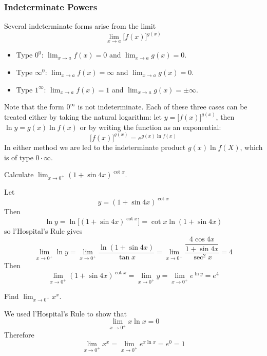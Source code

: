 \subsubsection*{Indeterminate Powers}
Several indeterminate forms arise from the limit
\[\lim_{x\to a}\bigl[f(x)\bigr]^{g(x)}\]
\begin{itemize}
    \item Type \(0^0\): \(\displaystyle{\lim_{x\to a}f(x)=0}\) and
    \(\displaystyle{\lim_{x\to a}g(x)=0}\).
    \item Type \(\infty^0\): \(\displaystyle{\lim_{x\to a}f(x)=\infty}\) and
    \(\displaystyle{\lim_{x\to a}g(x)=0}\).
    \item Type \(1^\infty\): \(\displaystyle{\lim_{x\to a}f(x)=1}\) and
    \(\displaystyle{\lim_{x\to a}g(x)=\pm\infty}\).
\end{itemize}
Note that the form \(0^\infty\) is not indeterminate.
Each of these three cases can be treated either by taking the natural
logarithm: let \(y=\bigl[f(x)\bigr]^{g(x)}\), then \(\ln y=g(x)\ln f(x)\) or
by writing the function as an exponential:
\[\bigl[f(x)\bigr]^{g(x)}=e^{g(x)\ln f(x)}\]
In either method we are led to the indeterminate product \(g(x)\ln f(X)\),
which is of type \(0\cdot\infty\).
\begin{problem}
    Calculate \(\displaystyle{\lim_{x\to 0^+}(1+\sin 4x)^{\cot x}}\).
\end{problem}
\begin{solution}
    Let
    \[y=(1+\sin 4x)^{\cot x}\]
    Then
    \[\ln y=\ln\bigl[(1+\sin 4x)^{\cot x}\bigr]=\cot x\ln(1+\sin 4x)\]
    so l'Hospital's Rule gives
    \[\lim_{x\to 0^+}\ln y=\lim_{x\to 0^+}\frac{\ln(1+\sin 4x)}{\tan x}
    =\lim_{x\to 0^+}\frac{\dfrac{4\cos 4x}{1+\sin 4x}}{\sec^2 x}=4\]
    Then
    \[\lim_{x\to 0^+}(1+\sin 4x)^{\cot x}=\lim_{x\to 0^+}y
    =\lim_{x\to 0^+}e^{\ln y}=e^4\]
\end{solution}
\begin{problem}
    Find \(\displaystyle{\lim_{x\to 0^+}x^x}\).
\end{problem}
\begin{solution}
    We used l'Hospital's Rule to show that
   \[\lim_{x\to 0^+}x\ln x=0\]
   Therefore
   \[\lim_{x\to 0^+}x^x=\lim_{x\to 0^+}e^{x\ln x}=e^0=1\]
\end{solution}